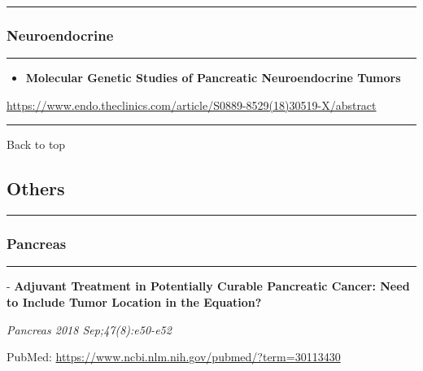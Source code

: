 \documentclass[]{article}
\providecommand{\tightlist}{%
  \setlength{\itemsep}{0pt}\setlength{\parskip}{0pt}}
\begin{document}
\begin{center}\rule{0.5\linewidth}{\linethickness}\end{center}

\hypertarget{neuroendocrine-2}{%
\subsubsection{Neuroendocrine}\label{neuroendocrine-2}}

\begin{center}\rule{0.5\linewidth}{\linethickness}\end{center}

\begin{itemize}
\tightlist
\item
  \textbf{Molecular Genetic Studies of Pancreatic Neuroendocrine Tumors}
\end{itemize}

\url{https://www.endo.theclinics.com/article/S0889-8529(18)30519-X/abstract}

\begin{center}\rule{0.5\linewidth}{\linethickness}\end{center}

Back to top

\pagebreak

\hypertarget{others}{%
\subsection{Others}\label{others}}

\begin{center}\rule{0.5\linewidth}{\linethickness}\end{center}

\hypertarget{pancreas-3}{%
\subsubsection{Pancreas}\label{pancreas-3}}

\begin{center}\rule{0.5\linewidth}{\linethickness}\end{center}

 - \textbf{Adjuvant Treatment in Potentially Curable Pancreatic Cancer:
Need to Include Tumor Location in the Equation?}

\emph{Pancreas 2018 Sep;47(8):e50-e52}

PubMed: \url{https://www.ncbi.nlm.nih.gov/pubmed/?term=30113430}

{}
\end{document}
